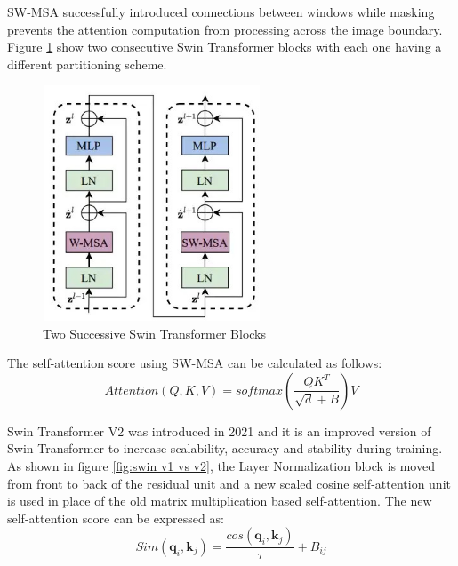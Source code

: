SW-MSA successfully introduced connections between windows while masking prevents the attention computation from processing across the image boundary. Figure \ref{fig:2swins} show two consecutive Swin Transformer blocks with each one having a different partitioning scheme.
\FloatBarrier
\begin{figure}[ht]
\includegraphics[width=6.5cm, height=7cm]{images/swin-architecture.jpg}
\centering
\caption{Two Successive Swin Transformer Blocks \protect\cite{swin-v1}}
\label{fig:2swins}
\end{figure}

The self-attention score using SW-MSA can be calculated as follows:
\begin{equation}
    Attention(Q,K,V) = softmax(\frac{QK^T}{\sqrt{d}+B})V
\end{equation}

Swin Transformer V2 \cite{swin-v2} was introduced in 2021 and it is an improved version of Swin Transformer to increase scalability, accuracy and stability during training. As shown in figure \ref{fig:swin v1 vs v2}, the Layer Normalization block is moved from front to back of the residual unit and a new scaled cosine self-attention unit is used in place of the old matrix multiplication based self-attention. The new self-attention score can be expressed as:
\begin{equation}
    Sim(\mathbf{q}_i,\mathbf{k}_j) = \frac{cos(\mathbf{q}_i,\mathbf{k}_j)}{\tau} + B_{ij}
\end{equation}

